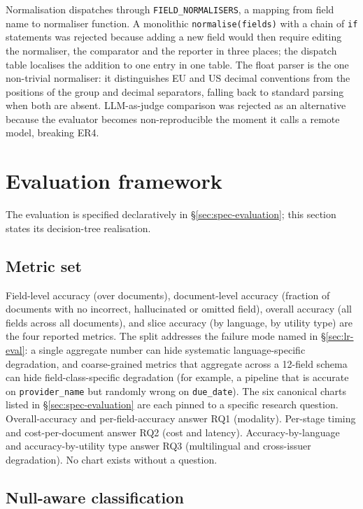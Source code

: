 Normalisation dispatches through \texttt{FIELD\_NORMALISERS}, a
mapping from field name to normaliser function. A monolithic
\texttt{normalise(fields)} with a chain of \texttt{if} statements
was rejected because adding a new field would then require editing
the normaliser, the comparator and the reporter in three places;
the dispatch table localises the addition to one entry in one table.
The float parser is the one non-trivial normaliser: it distinguishes
EU and US decimal conventions from the positions of the group and
decimal separators, falling back to standard parsing when both are
absent. LLM-as-judge comparison was rejected as an alternative
because the evaluator becomes non-reproducible the moment it calls
a remote model, breaking ER4.

\section{Evaluation framework}
\label{sec:design-evalframework}

The evaluation is specified declaratively in
\S\ref{sec:spec-evaluation}; this section states its decision-tree
realisation.

\subsection{Metric set}

Field-level accuracy (over documents), document-level accuracy
(fraction of documents with no incorrect, hallucinated or omitted
field), overall accuracy (all fields across all documents), and
slice accuracy (by language, by utility type) are the four reported
metrics. The split addresses the failure mode named in
\S\ref{sec:lr-eval}: a single aggregate number can hide systematic
language-specific degradation, and coarse-grained metrics that
aggregate across a 12-field schema can hide field-class-specific
degradation (for example, a pipeline that is accurate on
\texttt{provider\_name} but randomly wrong on \texttt{due\_date}).
The six canonical charts listed in \S\ref{sec:spec-evaluation} are
each pinned to a specific research question. Overall-accuracy and
per-field-accuracy answer RQ1 (modality). Per-stage timing and
cost-per-document answer RQ2 (cost and latency).
Accuracy-by-language and accuracy-by-utility type answer RQ3
(multilingual and cross-issuer degradation). No chart exists
without a question.

\subsection{Null-aware classification}

